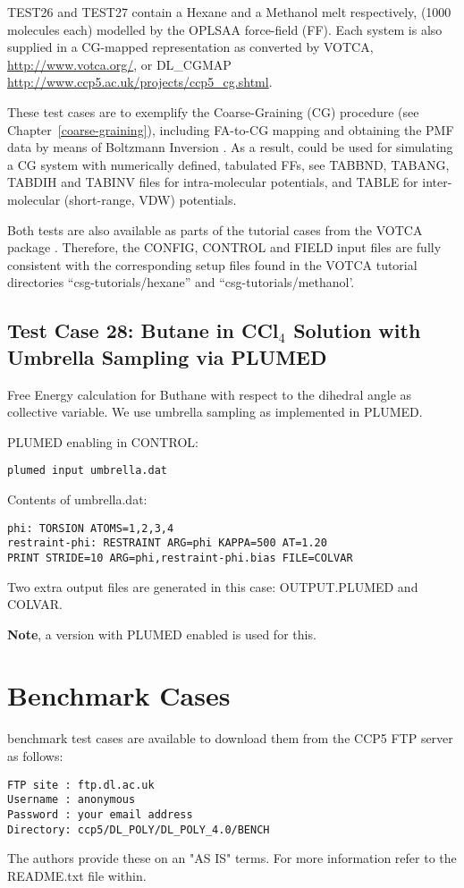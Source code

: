 TEST26 and TEST27 contain a Hexane and a Methanol melt respectively,
(1000 molecules each) modelled by the OPLSAA force-field (FF).
Each system is also supplied in a CG-mapped representation as converted
by VOTCA, \href{http://www.votca.org/}{http://www.votca.org/},
or DL\_CGMAP \href{http://www.ccp5.ac.uk/projects/ccp5\_cg.shtml}{http://www.ccp5.ac.uk/projects/ccp5\_cg.shtml}.

These test cases are to exemplify the Coarse-Graining (CG) procedure
(see Chapter~\ref{coarse-graining}), including FA-to-CG mapping and
obtaining the PMF data by means of Boltzmann Inversion \cite{reith-03a}.
As a result, \D could be used for simulating a CG system with numerically
defined, tabulated FFs, see TABBND, TABANG, TABDIH and TABINV files for
intra-molecular potentials, and TABLE for inter-molecular (short-range, VDW)
potentials.

Both tests are also available as parts of the tutorial cases from the
VOTCA package \cite{ruhle-09a}.  Therefore, the CONFIG, CONTROL and FIELD
input files are fully consistent with the corresponding setup files found
in the VOTCA tutorial directories ``csg-tutorials/hexane'' and ``csg-tutorials/methanol'.

\subsection{Test Case 28: Butane in CCl$_{4}$ Solution with Umbrella Sampling via PLUMED}

Free Energy calculation for Buthane with respect to the dihedral angle as
collective variable.  We use umbrella sampling as implemented in PLUMED.

PLUMED enabling in CONTROL:
\begin{lstlisting}
plumed input umbrella.dat
\end{lstlisting}

Contents of umbrella.dat:
\begin{lstlisting}
phi: TORSION ATOMS=1,2,3,4
restraint-phi: RESTRAINT ARG=phi KAPPA=500 AT=1.20
PRINT STRIDE=10 ARG=phi,restraint-phi.bias FILE=COLVAR
\end{lstlisting}

Two extra output files are generated in this case: OUTPUT.PLUMED and COLVAR.

{\bf Note}, a \D version with PLUMED enabled is used for this.

\section{Benchmark Cases}

\D benchmark test cases are available to download them from the CCP5 FTP
server as follows:

\begin{lstlisting}
FTP site : ftp.dl.ac.uk
Username : anonymous
Password : your email address
Directory: ccp5/DL_POLY/DL_POLY_4.0/BENCH
\end{lstlisting}

The \D authors provide these on an "AS IS" terms.  For more information
refer to the README.txt file within.
